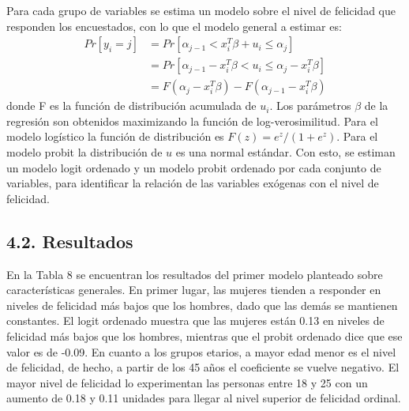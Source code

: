 \documentclass[12pt,spanish]{article}
\begin{document}
Para cada grupo de variables se estima un modelo sobre el nivel de felicidad que responden los encuestados, con lo que el modelo general a estimar es: 
\begin{align*}
    Pr[y_i=j]&=Pr[\alpha_{j-1}< x_{i}^{T}\beta+u_i\leq \alpha_j]  \\
    &=Pr[\alpha_{j-1}-x_{i}^{T}\beta< u_i\leq \alpha_j-x_{i}^{T}\beta]\\
    &= F(\alpha_j-x_{i}^{T}\beta)-F(\alpha_{j-1}-x_{i}^{T}\beta)
\end{align*}
donde F es la función de distribución acumulada de $u_i$. Los parámetros $\beta$ de la regresión son obtenidos maximizando la función de log-verosimilitud. Para el modelo logístico la función de distribución es $F(z)=e^{z}/(1+e^{z})$. Para el modelo probit la distribución de $u$ es una normal estándar. Con esto, se estiman un modelo logit ordenado y un modelo probit ordenado por cada conjunto de variables, para identificar la relación de las variables exógenas con el nivel de felicidad. 
\subsection*{4.2. Resultados}
En la Tabla 8 se encuentran los resultados del primer modelo planteado sobre características generales.  En primer lugar, las mujeres tienden a responder en niveles de felicidad más bajos que los hombres, dado que las demás se mantienen constantes. El logit ordenado muestra que las mujeres están 0.13 en niveles de felicidad más bajos que los hombres, mientras que el probit ordenado dice que ese valor es de -0.09. En cuanto a los grupos etarios, a mayor edad menor es el nivel de felicidad, de hecho, a partir de los 45 años el coeficiente se vuelve negativo. El mayor nivel de felicidad lo experimentan las personas entre 18 y 25 con un aumento de 0.18 y 0.11 unidades para llegar al nivel superior de felicidad ordinal. 
\end{document}
